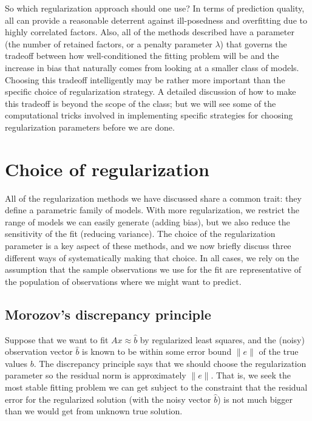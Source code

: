 \documentclass[12pt, leqno]{article} %
\begin{document}
So which regularization approach should one use?  In terms of
prediction quality, all can provide a reasonable deterrent against
ill-posedness and overfitting due to highly correlated factors.  Also,
all of the methods described have a parameter (the number of retained
factors, or a penalty parameter $\lambda$) that governs the tradeoff
between how well-conditioned the fitting problem will be and the
increase in bias that naturally comes from looking at a smaller class
of models.  Choosing this tradeoff intelligently may be rather more
important than the specific choice of regularization strategy.  A
detailed discussion of how to make this tradeoff is beyond the scope
of the class; but we will see some of the computational tricks
involved in implementing specific strategies for choosing
regularization parameters before we are done.

\section{Choice of regularization}

All of the regularization methods we have discussed share a common
trait: they define a parametric family of models.  With more
regularization, we restrict the range of models we can easily generate
(adding bias), but we also reduce the sensitivity of the fit (reducing
variance). The choice of the regularization parameter is a key aspect of
these methods, and we now briefly discuss three different ways of
systematically making that choice.  In all cases, we
rely on the assumption that the sample observations we use for the
fit are representative of the population of observations where we might
want to predict.

\subsection{Morozov's discrepancy principle}

Suppose that we want to fit $Ax \approx \hat{b}$ by regularized least
squares, and the (noisy) observation vector $\hat{b}$ is known to be
within some error bound $\|e\|$ of the true values $b$. The discrepancy
principle says that we should choose the regularization parameter so the
residual norm is approximately $\|e\|$. That is, we seek the most stable
fitting problem we can get subject to the constraint that the residual
error for the regularized solution (with the noisy vector $\hat{b}$) is
not much bigger than we would get from unknown true solution.
\end{document}
